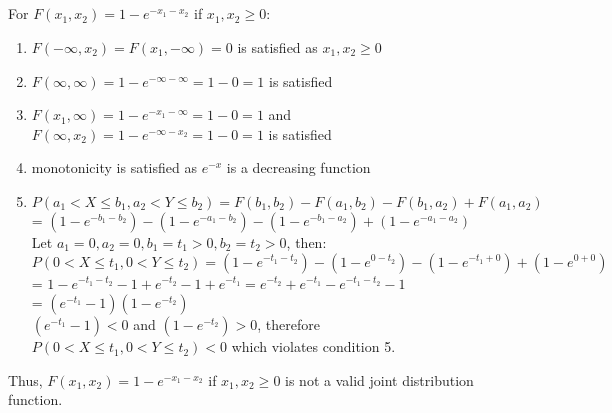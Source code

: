 \documentclass[11pt,a4paper,margin=1in]{article}
\begin{document}
    \subsection{}
        For $F(x_1, x_2) = 1 - e^{-x_1-x_2}$ if $x_1, x_2 \geq 0$:
        \begin{enumerate}[1.]
            \item $F(-\infty, x_2) = F(x_1, -\infty) = 0$ is satisfied as $x_1, x_2 \geq 0$
            \item $F(\infty, \infty) = 1 - e^{-\infty - \infty} = 1 - 0 = 1$ is satisfied
            \item $F(x_1, \infty) = 1 - e^{-x_1 - \infty} = 1 - 0 = 1$ and $F(\infty, x_2) = 1 - e^{-\infty - x_2} = 1 - 0 = 1$ is satisfied
            \item monotonicity is satisfied as $e^{-x}$ is a decreasing function
            \item $P(a_1 < X \leq b_1, a_2 < Y \leq b_2) = F(b_1, b_2) - F(a_1, b_2) - F(b_1, a_2) + F(a_1, a_2)$\\
            = $(1 - e^{-b_1 - b_2}) - (1 - e^{-a_1 - b_2}) - (1 - e^{-b_1 - a_2}) + (1 - e^{-a_1 - a_2})$\\
            Let $a_1 = 0, a_2 = 0, b_1 = t_1 > 0, b_2 = t_2 > 0$, then:\\
            $P(0 < X \leq t_1, 0 < Y \leq t_2) = (1 - e^{-t_1 - t_2}) - (1 - e^{0 - t_2}) - (1 - e^{-t_1 + 0}) + (1 - e^{0 + 0})$\\
            = $1 - e^{-t_1 - t_2} - 1 + e^{-t_2} - 1 + e^{-t_1} = e^{-t_2} + e^{-t_1} - e^{-t_1 - t_2} - 1$\\
            = $(e^{-t_1} - 1)(1 - e^{-t_2})$\\
            $(e^{-t_1} - 1) < 0$ and $(1 - e^{-t_2}) > 0$, therefore $P(0 < X \leq t_1, 0 < Y \leq t_2) < 0$ which violates condition 5.
        \end{enumerate}
        \noindent Thus, $F(x_1, x_2) = 1 - e^{-x_1-x_2}$ if $x_1, x_2 \geq 0$ is not a valid joint distribution function.
\end{document}
